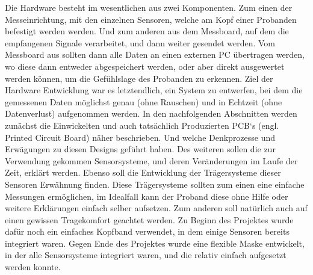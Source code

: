 

Die Hardware besteht im wesentlichen aus zwei Komponenten. Zum einen der Messeinrichtung, mit den einzelnen Sensoren, welche am Kopf einer Probanden befestigt werden werden. Und zum anderen aus dem Messboard, auf dem die empfangenen Signale verarbeitet, und dann weiter gesendet werden. Vom Messboard aus sollten dann alle Daten an einen externen PC übertragen werden, wo diese dann entweder abgespeichert werden, oder aber direkt ausgewertet werden können, um die Gefühlslage des Probanden zu erkennen.
Ziel der Hardware Entwicklung war es letztendlich, ein System zu entwerfen, bei dem die gemessenen Daten möglichst genau (ohne Rauschen) und in Echtzeit (ohne Datenverlust) aufgenommen werden.
In den nachfolgenden Abschnitten werden zunächst die Einwickelten und auch tatsächlich Produzierten PCB‘s (engl. Printed Circuit Board) näher beschrieben. Und welche Denkprozesse und Erwägungen zu diesen Designs geführt haben.
Des weiteren sollen die zur Verwendung gekommen Sensorsysteme, und deren Veränderungen im Laufe der Zeit, erklärt werden. Ebenso soll die Entwicklung der Trägersysteme dieser Sensoren Erwähnung finden. Diese Trägersysteme sollten zum einen eine einfache Messungen ermöglichen, im Idealfall kann der Proband diese ohne Hilfe oder weitere Erklärungen einfach selber aufsetzen. Zum anderen soll natürlich auch auf einen gewissen Tragekomfort geachtet werden. Zu Beginn des Projektes wurde dafür noch ein einfaches Kopfband verwendet, in dem einige Sensoren bereits integriert waren. Gegen Ende des Projektes wurde eine flexible Maske entwickelt, in der alle Sensorsysteme integriert waren, und die relativ einfach aufgesetzt werden konnte.













